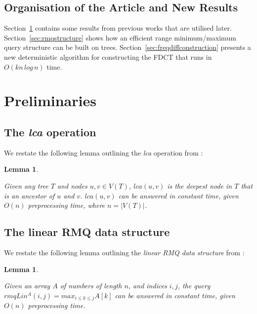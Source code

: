 \documentclass{article}
\newtheorem{lca}[incompatibility]{Lemma}
\newtheorem{linearrmq}[incompatibility]{Lemma}
\begin{document}
    \subsection{Organisation of the Article and New Results}
    Section~\ref{sec:preliminaries} contains some results from previous works that are utilised later. Section~\ref{sec:rmqstructure} shows how an efficient range minimum/maximum query structure can be built on trees. Section~\ref{sec:freqdiffconstruction} presents a new deterministic algorithm for constructing the FDCT that runs in $O(kn\,log\,n)$ time.

    \section{Preliminaries}
    \label{sec:preliminaries}

    \subsection{The \textit{lca} operation}

    We restate the following lemma outlining the \textit{lca} operation from \cite{bender2000lca}:
    \newline

    \begin{lca}
        \label{lem:lca}

        Given any tree $T$ and nodes $u, v \in V(T)$, $lca(u, v)$ is the deepest node in $T$ that is an ancestor of $u$ and $v$. $lca(u, v)$ can be answered in constant time, given $O(n)$ preprocessing time, where $n = |V(T)|$.
    \end{lca}

    \subsection{The linear RMQ data structure}

    We restate the following lemma outlining the \textit{linear RMQ data structure} from \cite{bender2000lca}:
    \newline

    \begin{linearrmq}
        \label{lem:linearrmq}

        Given an array $A$ of numbers of length $n$, and indices $i, j$, the query $rmqLin^A(i, j) = max_{i \leq k \leq j}A[k]$ can be answered in constant time, given $O(n)$ preprocessing time.
    \end{linearrmq}
\end{document}
